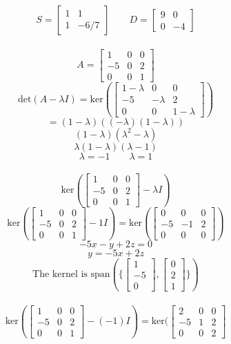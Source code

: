 \documentclass[hidelinks]{article}
\begin{document}
\[
	S = \begin{bmatrix} 1 & 1 \\ 1 & -6/7 \end{bmatrix} \quad \quad D = \begin{bmatrix} 9 & 0 \\ 0 & -4\end{bmatrix}	
\]
\\
\[
	A = \begin{bmatrix} 1 & 0 & 0 \\ -5 & 0 & 2 \\ 0 & 0 & 1 \end{bmatrix}
\]
\[
	\text{det}(A - \lambda I) = \text{ker}(\begin{bmatrix} 1 - \lambda & 0 & 0 \\ -5 & - \lambda & 2 \\ 0 & 0 & 1 -\lambda \end{bmatrix})
\]
\[
	= (1-\lambda)((-\lambda)(1-\lambda))
\]
\[
	(1 - \lambda)(\lambda^2 - \lambda)
\]
\[
	\lambda(1 - \lambda)(\lambda - 1)
\]
\[
	\lambda = - 1\quad \quad \lambda = 1
\]
\\
\[
	\text{ker}(\begin{bmatrix} 1 & 0 & 0 \\ -5 & 0 & 2 \\ 0 & 0 & 1 \end{bmatrix} - \lambda I)
\]
\[
	\text{ker}(\begin{bmatrix} 1 & 0 & 0 \\ -5 & 0 & 2 \\ 0 & 0 & 1 \end{bmatrix} - 1I) = 
	\text{ker}(\begin{bmatrix} 0 & 0 & 0 \\ -5 & -1 & 2 \\ 0 & 0 & 0 \end{bmatrix})
\]
\[
	-5x - y + 2z = 0 
\]
\[
	y  = -5x + 2z
\]
\[
	\text{The kernel is span}(\{\begin{bmatrix} 1 \\ -5 \\ 0 \end{bmatrix}, \begin{bmatrix} 0 \\ 2 \\ 1 \end{bmatrix}\})
\]
\\
\[
	\text{ker}(\begin{bmatrix} 1 & 0 & 0 \\ -5 & 0 & 2 \\ 0 & 0 & 1 \end{bmatrix} - (-1)I) =  
	\text{ker}(\begin{bmatrix} 2 & 0 & 0 \\ -5 & 1 & 2 \\ 0 & 0 & 2 \end{bmatrix} 
\]
\end{document}
